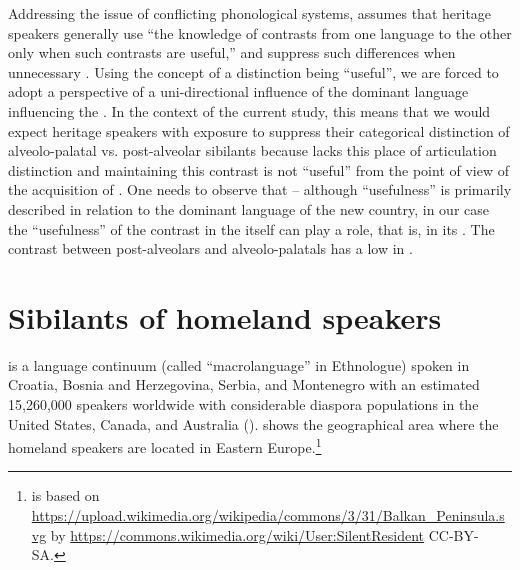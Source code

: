 \documentclass[output=paper,modfonts,newtxmath,hidelinks,]{langscibook}
\begin{document}
Addressing the issue of conflicting phonological systems, \citet{Polinsky2018} assumes that heritage speakers generally use “the knowledge of contrasts from one language to the other only when such contrasts are useful,” and suppress such differences when unnecessary \citep[115]{Polinsky2018}. Using the concept of a distinction being “useful”, we are forced to adopt a perspective of a uni-directional influence of the dominant language influencing the . In the context of the current study, this means that we would expect heritage  speakers with  exposure to suppress their categorical distinction of alveolo-palatal vs. post-alveolar sibilants because  lacks this place of articulation distinction and maintaining this contrast is not “useful” from the point of view of the acquisition of . One needs to observe that – although “usefulness” is primarily described in relation to the dominant language of the new country, in our case the “usefulness” of the contrast in the  itself can play a role, that is, in its . The contrast between post-alveolars and alveolo-palatals has a low  in .


\section{Sibilants of homeland speakers}\label{sec:mihajlovic:3}

 is a language continuum (called “macrolanguage” in Ethnologue) spoken in Croatia, Bosnia and Herzegovina, Serbia, and Montenegro with an estimated 15,260,000 speakers worldwide with considerable diaspora populations in the United States, Canada, and Australia (\citealt{Simons-Fennig2017}).  shows the geographical area where the homeland  speakers are located in Eastern Europe.\footnote{ is based on \url{https://upload.wikimedia.org/wikipedia/commons/3/31/Balkan_Peninsula.svg} by \url{https://commons.wikimedia.org/wiki/User:SilentResident} CC-BY-SA.}
\end{document}
